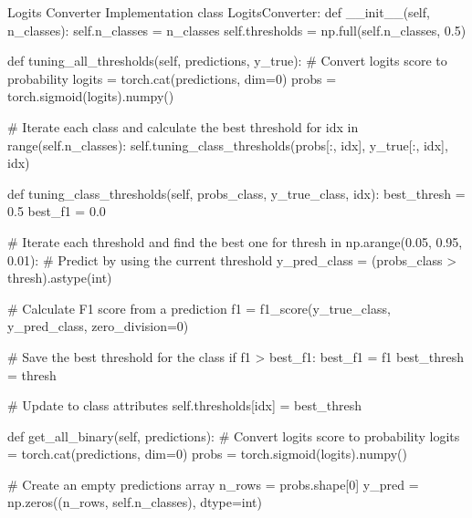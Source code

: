 \documentclass[12pt, a4paper]{article}
\begin{document}
                \begin{codeblock}{Logits Converter Implementation}
                    class LogitsConverter:
                        def __init__(self, n_classes):
                            self.n_classes = n_classes
                            self.thresholds = np.full(self.n_classes, 0.5)

                        def tuning_all_thresholds(self, predictions, y_true):
                            # Convert logits score to probability
                            logits = torch.cat(predictions, dim=0)
                            probs = torch.sigmoid(logits).numpy()

                            # Iterate each class and calculate the best threshold
                            for idx in range(self.n_classes):
                                self.tuning_class_thresholds(probs[:, idx], y_true[:, idx], idx)

                        def tuning_class_thresholds(self, probs_class, y_true_class, idx):
                            best_thresh = 0.5
                            best_f1 = 0.0

                            # Iterate each threshold and find the best one
                            for thresh in np.arange(0.05, 0.95, 0.01):
                                # Predict by using the current threshold
                                y_pred_class = (probs_class > thresh).astype(int)

                                # Calculate F1 score from a prediction
                                f1 = f1_score(y_true_class, y_pred_class, zero_division=0)

                                # Save the best threshold for the class
                                if f1 > best_f1:
                                    best_f1 = f1
                                    best_thresh = thresh

                            # Update to class attributes
                            self.thresholds[idx] = best_thresh

                        def get_all_binary(self, predictions):
                            # Convert logits score to probability
                            logits = torch.cat(predictions, dim=0)
                            probs = torch.sigmoid(logits).numpy()

                            # Create an empty predictions array
                            n_rows = probs.shape[0]
                            y_pred = np.zeros((n_rows, self.n_classes), dtype=int)


\end{codeblock}
\end{document}
